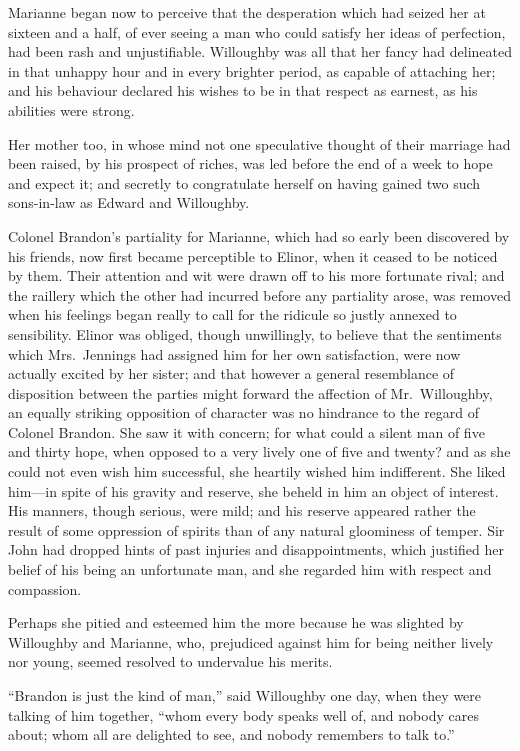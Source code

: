 \documentclass{article}
\begin{document}
Marianne began now to perceive that the desperation
which had seized her at sixteen and a half, of ever
seeing a man who could satisfy her ideas of perfection,
had been rash and unjustifiable.  Willoughby was all
that her fancy had delineated in that unhappy hour
and in every brighter period, as capable of attaching her;
and his behaviour declared his wishes to be in that respect
as earnest, as his abilities were strong.

Her mother too, in whose mind not one speculative
thought of their marriage had been raised, by his prospect
of riches, was led before the end of a week to hope and
expect it; and secretly to congratulate herself on having
gained two such sons-in-law as Edward and Willoughby.

Colonel Brandon's partiality for Marianne, which had
so early been discovered by his friends, now first became
perceptible to Elinor, when it ceased to be noticed
by them.  Their attention and wit were drawn off to his
more fortunate rival; and the raillery which the other
had incurred before any partiality arose, was removed
when his feelings began really to call for the ridicule
so justly annexed to sensibility.  Elinor was obliged,
though unwillingly, to believe that the sentiments which
Mrs.\ Jennings had assigned him for her own satisfaction,
were now actually excited by her sister; and that however
a general resemblance of disposition between the parties
might forward the affection of Mr.\ Willoughby, an equally
striking opposition of character was no hindrance to the
regard of Colonel Brandon.  She saw it with concern;
for what could a silent man of five and thirty hope,
when opposed to a very lively one of five and twenty? and as
she could not even wish him successful, she heartily wished
him indifferent.  She liked him---in spite of his gravity
and reserve, she beheld in him an object of interest.
His manners, though serious, were mild; and his reserve
appeared rather the result of some oppression of spirits
than of any natural gloominess of temper.  Sir John
had dropped hints of past injuries and disappointments,
which justified her belief of his being an unfortunate man,
and she regarded him with respect and compassion.

Perhaps she pitied and esteemed him the more
because he was slighted by Willoughby and Marianne,
who, prejudiced against him for being neither lively
nor young, seemed resolved to undervalue his merits.

``Brandon is just the kind of man,'' said Willoughby
one day, when they were talking of him together,
``whom every body speaks well of, and nobody cares about;
whom all are delighted to see, and nobody remembers
to talk to.''
\end{document}
